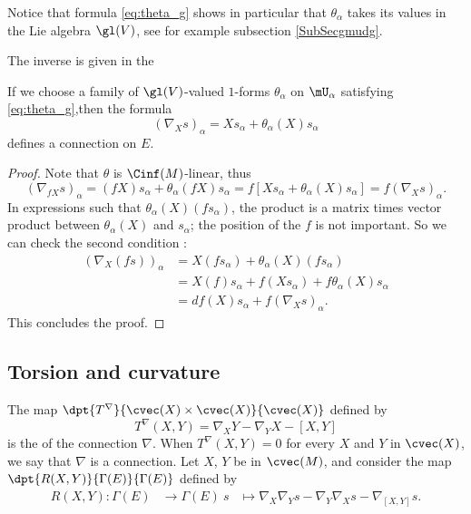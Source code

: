 Notice that formula \eqref{eq:theta_g} shows in particular that $\theta_{\alpha}$ takes its values in the Lie algebra $\gl(V)$, see for example subsection \ref{SubSecgmudg}.

The inverse is given in the
\begin{proposition}	\label{Propformconnve}
If we choose a family of $\gl(V)$-valued $1$-forms $\theta_{\alpha}$ on $\mU_{\alpha}$ satisfying \eqref{eq:theta_g},then the formula
\[
  (\nabla_Xs)_{\alpha}=Xs_{\alpha}+\theta_{\alpha}(X)s_{\alpha}
\]
defines a connection on $E$.\label{prop:thet_conn_F}
\end{proposition}

\begin{proof}
Note that $\theta$ is $\Cinf(M)$-linear, thus
\begin{equation}
  (\nabla_{fX}s)_{\alpha}=(fX)s_{\alpha}+\theta_{\alpha}(fX)s_{\alpha}
                        =f[ Xs_{\alpha}+\theta_{\alpha}(X)s_{\alpha} ]
			=f(\nabla_Xs)_{\alpha}.
\end{equation}
In expressions such that $\theta_{\alpha}(X)(fs_{\alpha})$, the product is a matrix times vector product between $\theta_{\alpha}(X)$ and $s_{\alpha}$; the position of the $f$ is not important. So we can check the second condition :
\begin{equation}
\begin{split}
(\nabla_X(fs))_{\alpha}&=X(fs_{\alpha})+\theta_{\alpha}(X)(fs_{\alpha}) \\
                     &=X(f)s_{\alpha}+f(Xs_{\alpha})+f\theta_{\alpha}(X)s_{\alpha}\\
		     &=df(X)s_{\alpha}+f(\nabla_Xs)_{\alpha}.
\end{split}
\end{equation}
This concludes the proof.
\end{proof}


\subsection{Torsion and curvature}

The map $\dpt{T^{\nabla}}{\cvec(X)\times\cvec(X)}{\cvec(X)}$ defined by
\begin{equation}
     T^{\nabla}(X,Y)=\nabla_XY-\nabla_YX-[X,Y]\label{deftorsion}
\end{equation}
is the  of the connection $\nabla$. When $T^{\nabla}(X,Y)=0$ for every $X$ and $Y$ in $\cvec(X)$, we say that $\nabla$ is a  connection. Let $X$, $Y$ be in $\cvec(M)$, and consider the map $\dpt{R(X,Y)}{\Gamma(E)}{\Gamma(E)}$ defined by
		\begin{equation}
		\begin{aligned}
			R(X,Y) \colon \Gamma(E) &\to \Gamma(E)\
			s&\mapsto \nabla_X\nabla_Ys-\nabla_Y\nabla_Xs-\nabla_{[X,Y]}s.
		\end{aligned}
	\end{equation}	

